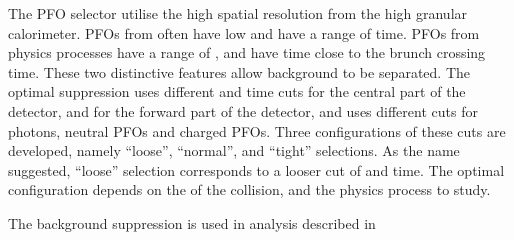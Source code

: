 The PFO selector utilise the high spatial resolution from the high granular calorimeter. PFOs from \ggHad often have low \pT and have a range of time. PFOs from physics processes have a range of \pT, and have time close to the brunch crossing time. These two distinctive features allow \ggHad background to be separated. The optimal suppression uses different \pT and time cuts for the central part of the detector, and for the forward part of the detector, and uses different cuts for photons, neutral PFOs and charged PFOs. Three configurations of these cuts are developed, namely ``loose'', ``normal'', and ``tight'' selections. As the name suggested, ``loose'' selection corresponds to a looser cut of \pT and time. The optimal configuration depends on the \sqrtS of the collision, and the physics process to study.

The background suppression is used in analysis described in 
